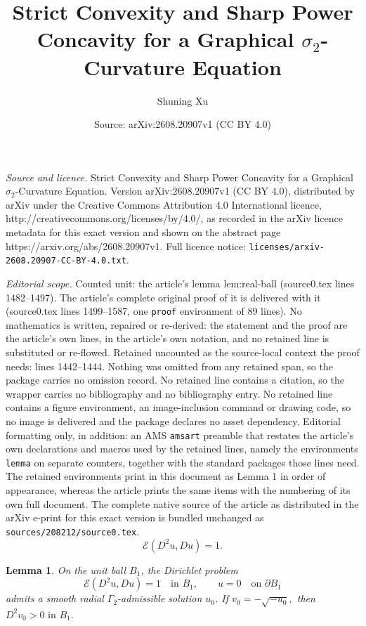 \documentclass[10pt,a4paper]{amsart}
\title{Strict Convexity and Sharp Power Concavity for a Graphical $\sigma_2$-Curvature Equation}
\author{Shuning Xu}
\date{Source: arXiv:2608.20907v1 (CC BY 4.0)}
\newtheorem{lemma}{Lemma}
\begin{document}
\maketitle

\noindent\emph{Source and licence.} Strict Convexity and Sharp Power Concavity for a Graphical $\sigma_2$-Curvature Equation. Version arXiv:2608.20907v1 (CC BY 4.0), distributed by arXiv under the Creative Commons Attribution 4.0 International licence, http://creativecommons.org/licenses/by/4.0/, as recorded in the arXiv licence metadata for this exact version and shown on the abstract page https://arxiv.org/abs/2608.20907v1. Full licence notice: \texttt{licenses/arxiv-2608.20907-CC-BY-4.0.txt}.\par\smallskip

\noindent\textit{Editorial scope.} Counted unit: the article's lemma lem:real-ball (source0.tex lines 1482--1497). The article's complete original proof of it is delivered with it (source0.tex lines 1499--1587, one \texttt{proof} environment of 89 lines). No mathematics is written, repaired or re-derived: the statement and the proof are the article's own lines, in the article's own notation, and no retained line is substituted or re-flowed.  Retained uncounted as the source-local context the proof needs: lines 1442--1444.  Nothing was omitted from any retained span, so the package carries no omission record.  No retained line contains a citation, so the wrapper carries no bibliography and no bibliography entry.  No retained line contains a figure environment, an image-inclusion command or drawing code, so no image is delivered and the package declares no asset dependency.  Editorial formatting only, in addition: an AMS \texttt{amsart} preamble that restates the article's own declarations and macros used by the retained lines, namely the environments \texttt{lemma} on separate counters, together with the standard packages those lines need.  The retained environments print in this document as Lemma 1 in order of appearance, whereas the article prints the same items with the numbering of its own full document.  The complete native source of the article as distributed in the arXiv e-print for this exact version is bundled unchanged as \texttt{sources/208212/source0.tex}.
\begin{equation}\label{eq:real-main-1}
\mathcal E(D^2u,Du)=1.
\end{equation}

\begin{lemma}
\label{lem:real-ball}
On the unit ball $B_1$, the Dirichlet problem
\[
\mathcal E(D^2u,Du)=1
\quad\text{in }B_1,
\qquad
u=0
\quad\text{on }\partial B_1
\]
admits a smooth radial $\Gamma_2$-admissible solution $u_0$.
If
$v_0=-\sqrt{-u_0},$
then
$D^2v_0>0\,\,\text{in }B_1.$
\end{lemma}
\end{document}
